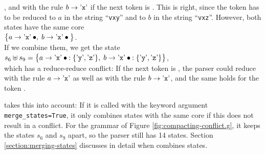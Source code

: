 , and with the rule $b \rightarrow \mbox{'\texttt{x}'}$ if the next token is .  This is right,
since the token  has to be reduced to $a$ in the string ``\texttt{vxy}'' and to $b$ in the string
``\texttt{vxz}''.  However, both states have the same core
\\[0.2cm]
\hspace*{1.3cm}
$\bigl\{ a \rightarrow \saquoted{x} \mdot,\; b \rightarrow \saquoted{x} \mdot \bigr\}$.
\\[0.2cm]
If we combine them, we get the state
\\[0.2cm]
\hspace*{1.3cm}
$s_6 \uplus s_9 = \bigl\{ a \rightarrow \saquoted{x} \mdot: \{\saquoted{y}, \saquoted{z} \},\;
                     b \rightarrow \saquoted{x} \mdot: \{\saquoted{y}, \saquoted{z} \} \bigr\}$,
\\[0.2cm]
which has a reduce-reduce conflict:  If the next token is , the parser could reduce with the rule
$a \rightarrow \mbox{'\texttt{x}'}$ as well as with the rule $b \rightarrow \mbox{'\texttt{x}'}$, and the same holds for the
token .

 takes this into account:  If it is called with the keyword argument
\texttt{merge\_states=True}, it only combines states with the same core if this does not result in a conflict.
For the grammar of Figure \ref{fig:compacting-conflict.g}, it keeps the states $s_6$ and $s_9$ apart, so the parser
still has 14 states.  Section \ref{section:merging-states} discusses in detail when  combines
states.

